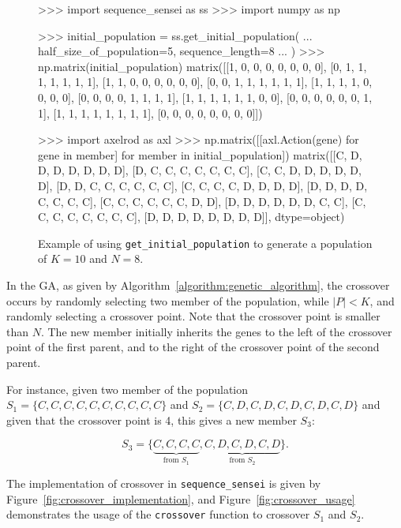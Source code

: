\begin{figure}[!htbp]
    \begin{usagepy}
>>> import sequence_sensei as ss
>>> import numpy as np

>>> initial_population = ss.get_initial_population(
...     half_size_of_population=5, sequence_length=8
... )
>>> np.matrix(initial_population)
matrix([[1, 0, 0, 0, 0, 0, 0, 0],
        [0, 1, 1, 1, 1, 1, 1, 1],
        [1, 1, 0, 0, 0, 0, 0, 0],
        [0, 0, 1, 1, 1, 1, 1, 1],
        [1, 1, 1, 1, 0, 0, 0, 0],
        [0, 0, 0, 0, 1, 1, 1, 1],
        [1, 1, 1, 1, 1, 1, 0, 0],
        [0, 0, 0, 0, 0, 0, 1, 1],
        [1, 1, 1, 1, 1, 1, 1, 1],
        [0, 0, 0, 0, 0, 0, 0, 0]])

>>> import axelrod as axl
>>> np.matrix([[axl.Action(gene) for gene in member] for member in initial_population])
matrix([[C, D, D, D, D, D, D, D],
        [D, C, C, C, C, C, C, C],
        [C, C, D, D, D, D, D, D],
        [D, D, C, C, C, C, C, C],
        [C, C, C, C, D, D, D, D],
        [D, D, D, D, C, C, C, C],
        [C, C, C, C, C, C, D, D],
        [D, D, D, D, D, D, C, C],
        [C, C, C, C, C, C, C, C],
        [D, D, D, D, D, D, D, D]], dtype=object)

\end{usagepy}
\caption{Example of using \texttt{get_initial_population} to
generate a population of \(K=10\) and \(N=8\).}\label{fig:get_initial_population_example}
\end{figure}

In the GA, as given by Algorithm~\ref{algorithm:genetic_algorithm}, the
crossover occurs by randomly selecting two member of the population, while \(|P|
< K\), and randomly selecting a crossover point. Note that the crossover
point is smaller than \(N\). The new member initially inherits the
genes to the left of the crossover point of the first parent, and to the right
of the crossover point of the second parent.

For instance, given two member of the population \(S_1 = \{C, C, C, C, C, C, C, C, C, C\}\)
and \(S_2 = \{C, D, C, D, C, D, C, D, C, D\}\) and given that the crossover point is
4, this gives a new member \(S_3\):

\[S_3 = \{\underbrace{C, C, C, C}_{\text{from } S_1}, \underbrace{C, D, C, D, C, D}_{\text{from } S_2}\}.\]

The implementation of crossover in \texttt{sequence_sensei} is given
by Figure~\ref{fig:crossover_implementation}, and Figure~\ref{fig:crossover_usage}
demonstrates the usage of the \texttt{crossover} function to crossover
\(S_1\) and \(S_2\).

